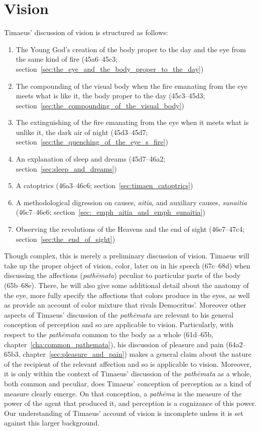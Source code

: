 
\section{Vision} %
\label{sec:vision}
Timaeus' discussion of vision is structured as follows:
\begin{enumerate}[(1)]
	\item The Young God's creation of the body proper to the day and the eye from the same kind of fire (45a6--45c3; section~\ref{sec:the_eye_and_the_body_proper_to_the_day})
	\item The compounding of the visual body when the fire emanating from the eye meets what is like it, the body proper to the day (45c3--45d3; section~\ref{sec:the_compounding_of_the_visual_body})
	\item The extinguishing of the fire emanating from the eye when it meets what is unlike it, the dark air of night (45d3--45d7; section~\ref{sec:the_quenching_of_the_eye_s_fire})
	\item An explanation of sleep and dreams (45d7--46a2; section~\ref{sec:sleep_and_dreams})
	\item A catoptrics (46a3--46c6; section~\ref{sec:timaen_catoptrics})
	\item A methodological digression on causes, \emph{aitia}, and auxiliary causes, \emph{sunaitia} (46c7--46e6; section~\ref{sec:_emph_aitia_and_emph_sunaitia})
	\item Observing the revolutions of the Heavens and the end of sight (46e7--47c4; section~\ref{sec:the_end_of_sight})
\end{enumerate}
Though complex, this is merely a preliminary discussion of vision. Timaeus will take up the proper object of vision, color, later on in his speech (67c–68d) when discussing the affections (\emph{pathēmata}) peculiar to particular parts of the body (65b–68e). There, he will also give some additional detail about the anatomy of the eye, more fully specify the affections that colors produce in the eyes, as well as provide an account of color mixture that rivals Democritus'. Moreover other aspects of Timaeus' discussion of the \emph{pathēmata} are relevant to his general conception of perception and so are applicable to vision. Particularly, with respect to the \emph{pathēmata} common to the body as a whole (61d–65b, chapter~\ref{cha:common_pathemata}), his discussion of pleasure and pain (64a2–65b3, chapter~\ref{sec:pleasure_and_pain}) makes a general claim about the nature of the recipient of the relevant affection and so is applicable to vision. Moreover, it is only within the context of Timaeus' discussion of the \emph{pathēmata} as a whole, both common and peculiar, does Timaeus' conception of perception as a kind of measure clearly emerge. On that conception, a \emph{pathēma} is the measure of the power of the agent that produced it, and perception is a cognizance of this power. Our understanding of Timaeus' account of vision is incomplete unless it is set against this larger background.

